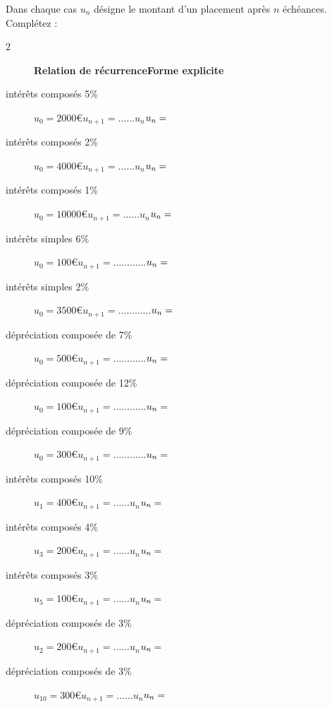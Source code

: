 \documentclass[main.tex]{subfiles}
\begin{document}
\begin{exercise}\label{chapter05:exercise:suites09} Dans chaque cas $u_n$ désigne le montant d'un placement après $n$ échéances. Complétez : 
\begin{spacing}{2}
	\begin{description}
		\item[]\hfill\hfill \textbf{Relation de récurrence}\hfill \textbf{Forme explicite}
		\item[intérêts composés 5\%] $u_0=2000€$\hfill $u_{n+1}=\ldots\ldots u_n$\hfill $u_n=\dotfill $
		\item[intérêts composés 2\%] $u_0=4000€$\hfill $u_{n+1}=\ldots\ldots u_n$\hfill $u_n=\dotfill $
		\item[intérêts composés 1\%] $u_0=10000€$\hfill $u_{n+1}=\ldots\ldots u_n$\hfill $u_n=\dotfill $
		\item[intérêts simples 6\%] $u_0=100€$\hfill $u_{n+1}=\ldots\ldots \ldots\ldots$\hfill   $u_n=\dotfill $ 
		\item[intérêts simples 2\%] $u_0=3500€$\hfill $u_{n+1}=\ldots\ldots \ldots\ldots$\hfill   $u_n=\dotfill $ 
		\item[dépréciation composée de 7\%] $u_0=500€$\hfill $u_{n+1}=\ldots\ldots \ldots\ldots$\hfill   $u_n=\dotfill $ 
		\item[dépréciation composée de 12\%] $u_0=100€$\hfill $u_{n+1}=\ldots\ldots \ldots\ldots$\hfill   $u_n=\dotfill $ 
		\item[dépréciation composée de 9\%] $u_0=300€$\hfill $u_{n+1}=\ldots\ldots \ldots\ldots$\hfill   $u_n=\dotfill $ 
		\item[intérêts composés 10\%] $u_1=400€$\hfill $u_{n+1}=\ldots\ldots u_n$\hfill $u_n=\dotfill $
		\item[intérêts composés 4\%] $u_3=200€$\hfill $u_{n+1}=\ldots\ldots u_n$\hfill $u_n=\dotfill $
		\item[intérêts composés 3\%] $u_5=100€$\hfill $u_{n+1}=\ldots\ldots u_n$\hfill $u_n=\dotfill $
		\item[dépréciation composés de 3\%] $u_{2}=200€$\hfill $u_{n+1}=\ldots\ldots u_n$\hfill $u_n=\dotfill $
		\item[dépréciation composés de 3\%] $u_{10}=300€$\hfill $u_{n+1}=\ldots\ldots u_n$\hfill $u_n=\dotfill $
	\end{description}
\vspace{-1em}
\end{spacing} 
\end{exercise} 
\end{document}
